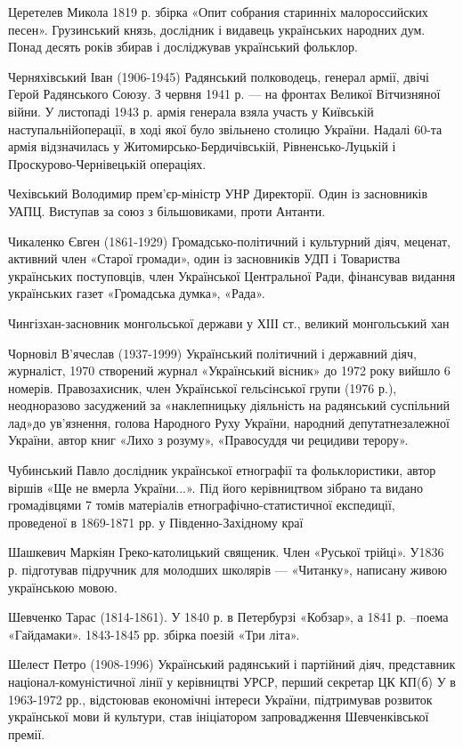 Церетелев Микола 1819 р. збірка «Опит собрания старинніх малороссийских песен». Грузинський князь, дослідник і видавець українських народних дум. Понад десять років збирав і досліджував український фольклор.

Черняхівський Іван   (1906-1945) Радянський полководець, генерал армії, двічі Герой Радянського Союзу. З червня 1941 р. --- на фронтах Великої Вітчизняної війни. У листопаді 1943 р. армія генерала взяла участь у Київській наступальнійоперації, в ході якої було звільнено столицю України. Надалі 60-та армія відзначилась у Житомирсько-Бердичівській, Рівненсько-Луцькій і Проскурово-Чернівецькій операціях.

Чехівський Володимир прем'єр-міністр УНР Директорії. Один із засновників УАПЦ.  Виступав за союз з більшовиками, проти Антанти.

Чикаленко Євген (1861-1929) Громадсько-політичний і культурний діяч, меценат, активний член «Старої громади», один із засновників УДП і Товариства українських поступовців, член Української Центральної Ради, фінансував видання українських газет «Громадська думка», «Рада».

Чингізхан-засновник монгольської держави у ХІІІ ст., великий монгольський хан

Чорновіл В’ячеслав (1937-1999) Український політичний і державний діяч, журналіст, 1970 створений журнал «Український вісник» до 1972 року вийшло 6 номерів. Правозахисник, член Української гельсінської групи (1976 р.), неодноразово засуджений за «наклепницьку діяльність на радянський суспільний лад»до ув’язнення, голова Народного Руху України, народний депутатнезалежної України, автор книг «Лихо з розуму», «Правосуддя чи рецидиви терору». 

Чубинський Павло дослідник української етнографії та фольклористики, автор віршів «Ще не вмерла України...». Під його керівництвом зібрано та видано громадівцями  7 томів матеріалів етнографічно-статистичної експедиції, проведеної в 1869-1871 рр. у Південно-Західному краї

Шашкевич Маркіян Греко-католицький священик. Член «Руської трійці». У1836 р. підготував підручник для молодших школярів --- «Читанку», написану живою українською мовою.

Шевченко Тарас (1814-1861). У 1840 р. в Петербурзі «Кобзар», а 1841 р. –поема «Гайдамаки». 1843-1845 рр. збірка поезій «Три літа».

Шелест Петро (1908-1996) Український радянський і партійний діяч, представник націонал-комуністичної лінії у керівництві УРСР, перший секретар ЦК КП(б) У в 1963-1972 рр., відстоював економічні інтереси України, підтримував розвиток української мови й культури, став ініціатором запровадження Шевченківської премії.

